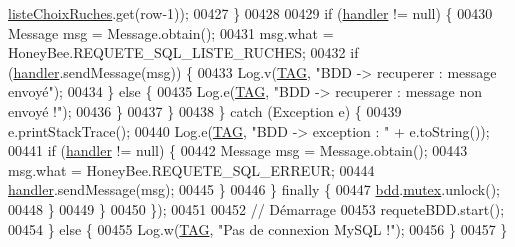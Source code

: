 \begin{DoxyCode}
      \hyperlink{classfr_1_1campus_1_1laurainc_1_1honeybee_1_1_ruche_accb6ae9a3a546857525f0e1cdc023250}{listeChoixRuches}.get(row-1));
00427                         \}
00428 
00429                         \textcolor{keywordflow}{if} (\hyperlink{classfr_1_1campus_1_1laurainc_1_1honeybee_1_1_ruche_a9689ca454694434549e5fffca876ffae}{handler} != null) \{
00430                             Message msg = Message.obtain();
00431                             msg.what = HoneyBee.REQUETE\_SQL\_LISTE\_RUCHES;
00432                             \textcolor{keywordflow}{if} (\hyperlink{classfr_1_1campus_1_1laurainc_1_1honeybee_1_1_ruche_a9689ca454694434549e5fffca876ffae}{handler}.sendMessage(msg)) \{
00433                                 Log.v(\hyperlink{classfr_1_1campus_1_1laurainc_1_1honeybee_1_1_ruche_a44739cbb0fa7451c1edc240a3f51c257}{TAG}, \textcolor{stringliteral}{"BDD -> recuperer : message envoyé"});
00434                             \} \textcolor{keywordflow}{else} \{
00435                                 Log.e(\hyperlink{classfr_1_1campus_1_1laurainc_1_1honeybee_1_1_ruche_a44739cbb0fa7451c1edc240a3f51c257}{TAG}, \textcolor{stringliteral}{"BDD -> recuperer : message non envoyé !"});
00436                             \}
00437                         \}
00438                     \} \textcolor{keywordflow}{catch} (Exception e) \{
00439                         e.printStackTrace();
00440                         Log.e(\hyperlink{classfr_1_1campus_1_1laurainc_1_1honeybee_1_1_ruche_a44739cbb0fa7451c1edc240a3f51c257}{TAG}, \textcolor{stringliteral}{"BDD -> exception : "} + e.toString());
00441                         \textcolor{keywordflow}{if} (\hyperlink{classfr_1_1campus_1_1laurainc_1_1honeybee_1_1_ruche_a9689ca454694434549e5fffca876ffae}{handler} != null) \{
00442                             Message msg = Message.obtain();
00443                             msg.what = HoneyBee.REQUETE\_SQL\_ERREUR;
00444                             \hyperlink{classfr_1_1campus_1_1laurainc_1_1honeybee_1_1_ruche_a9689ca454694434549e5fffca876ffae}{handler}.sendMessage(msg);
00445                         \}
00446                     \} \textcolor{keywordflow}{finally} \{
00447                         \hyperlink{classfr_1_1campus_1_1laurainc_1_1honeybee_1_1_ruche_a0eb43a2b63fb83e9d5af6cd6b754c7da}{bdd}.\hyperlink{classfr_1_1campus_1_1laurainc_1_1honeybee_1_1_base_de_donnees_a0dd6f285a11459c086adea6080bed282}{mutex}.unlock();
00448                     \}
00449                 \}
00450             \});
00451 
00452             \textcolor{comment}{// Démarrage}
00453             requeteBDD.start();
00454         \} \textcolor{keywordflow}{else} \{
00455             Log.w(\hyperlink{classfr_1_1campus_1_1laurainc_1_1honeybee_1_1_ruche_a44739cbb0fa7451c1edc240a3f51c257}{TAG}, \textcolor{stringliteral}{"Pas de connexion MySQL !"});
00456         \}
00457     \}
\end{DoxyCode}
